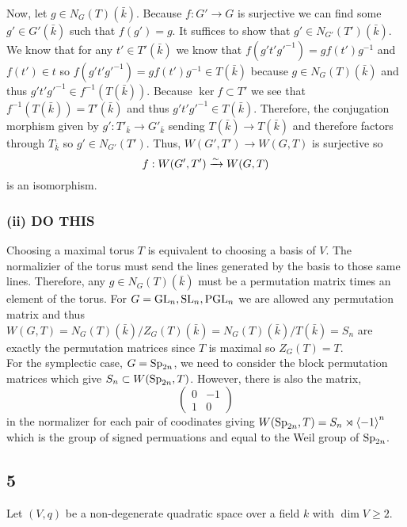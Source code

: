 \documentclass[12pt]{article}
\begin{document}
\bigskip\\
Now, let $g \in N_G(T)(\bar{k})$. Because $f : G' \to G$ is surjective we can find some $g' \in G'(\bar{k})$ such that $f(g') = g$. It suffices to show that $g' \in N_{G'}(T')(\bar{k})$. We know that for any $t' \in T'(\bar{k})$ we know that $f(g' t' g'^{-1}) = g f(t') g^{-1}$ and $f(t') \in t$ so $f(g' t' g'^{-1}) = g f(t') g^{-1} \in T(\bar{k})$ because $g \in N_G(T)(\bar{k})$ and thus $g' t' g'^{-1} \in f^{-1}(T(\bar{k}))$. Because $\ker{f} \subset T'$ we see that $f^{-1}(T(\bar{k})) = T'(\bar{k})$ and thus $g' t' g'^{-1} \in T(\bar{k})$. Therefore, the conjugation morphism given by $g' : T'_{\bar{k}} \to G'_{\bar{k}}$ sending $T(\bar{k}) \to T(\bar{k})$ and therefore factors through $T_{\bar{k}}$ so $g' \in N_{G'}(T')$. Thus, $W(G',T') \to W(G,T)$ is surjective so
\[ f : W(G',T') \xrightarrow{\sim} W(G,T) \]
is an isomorphism.


\subsubsection{(ii) DO THIS}

Choosing a maximal torus $T$ is equivalent to choosing a basis of $V$. The normalizier of the torus must send the lines generated by the basis to those same lines. Therefore, any $g \in N_{G}(T)(\bar{k})$ must be a permutation matrix times an element of the torus. For $G = \mathrm{GL}_n, \mathrm{SL}_n, \mathrm{PGL}_n$ we are allowed any permutation matrix and thus $W(G,T) = N_G(T)(\bar{k})/Z_G(T)(\bar{k}) = N_G(T)(\bar{k})/T(\bar{k}) = S_n$ are exactly the permutation matrices since $T$ is maximal so $Z_G(T) = T$. 
\bigskip\\
For the symplectic case, $G = \mathrm{Sp}_{2n}$, we need to consider the block permutation matrices which give $S_n \subset W(\mathrm{Sp}_{2n}, T)$. However, there is also the matrix,
\[
\begin{pmatrix}
0 & - 1
\\
1 & 0 
\end{pmatrix} \]
in the normalizer for each pair of coodinates giving $W(\mathrm{Sp}_{2n}, T) = S_n \rtimes \left< - 1 \right>^n$ which is the group of signed permuations and equal to the Weil group of $\mathrm{Sp}_{2n}$.

\subsection{5}

Let $(V, q)$ be a non-degenerate quadratic space over a field $k$ with $\dim{V} \ge 2$. 
\end{document}
